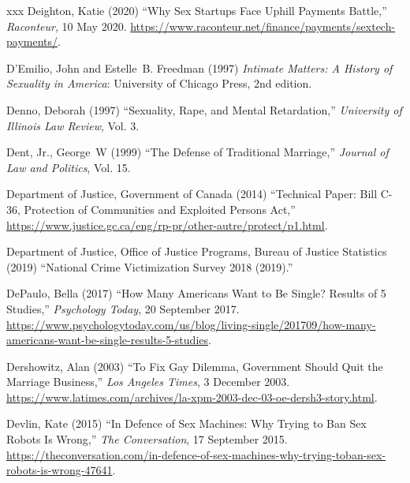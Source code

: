 \documentclass[]{jlreq} \usepackage{mystyle}
\begin{document}
\begin{thebibliography}{xxx}
Deighton, Katie (2020) ``Why Sex Startups Face Uphill Payments Battle,''
  \emph{Raconteur}, 10 May 2020.
  \url{https://www.raconteur.net/finance/payments/sextech-payments/}.

D'Emilio, John and Estelle~B. Freedman (1997)  \textit{ Intimate Matters: A
  History of Sexuality in America}: University of Chicago Press, 2nd edition.

Denno, Deborah (1997) ``Sexuality, Rape, and Mental Retardation,'' \textit{
  University of Illinois Law Review}, Vol. 3.

Dent, Jr., George~W (1999) ``The Defense of Traditional Marriage,'' \textit{
  Journal of Law and Politics}, Vol. 15.

{Department of Justice, Government of Canada} (2014) ``Technical Paper: Bill
  C-36, Protection of Communities and Exploited Persons Act,''
  \url{https://www.justice.gc.ca/eng/rp-pr/other-autre/protect/p1.html}.

{Department of Justice}, {Office of Justice Programs, Bureau of Justice
  Statistics} (2019) ``National Crime Victimization Survey 2018 (2019).''

DePaulo, Bella (2017) ``How Many Americans Want to Be Single? Results of 5
  Studies,'' \emph{Psychology Today}, 20 September 2017.
  \url{https://www.psychologytoday.com/us/blog/living-single/201709/how-many-americans-want-be-single-results-5-studies}.

Dershowitz, Alan (2003) ``To Fix Gay Dilemma, Government Should Quit the
  Marriage Business,'' \emph{Los Angeles Times}, 3 December 2003.
  \url{https://www.latimes.com/archives/la-xpm-2003-dec-03-oe-dersh3-story.html}.

Devlin, Kate (2015) ``In Defence of Sex Machines: Why Trying to Ban Sex Robots
  Is Wrong,'' \emph{The Conversation}, 17 September 2015.
  \url{https://theconversation.com/in-defence-of-sex-machines-why-trying-toban-sex-robots-is-wrong-47641}.


\end{thebibliography}
\end{document}
